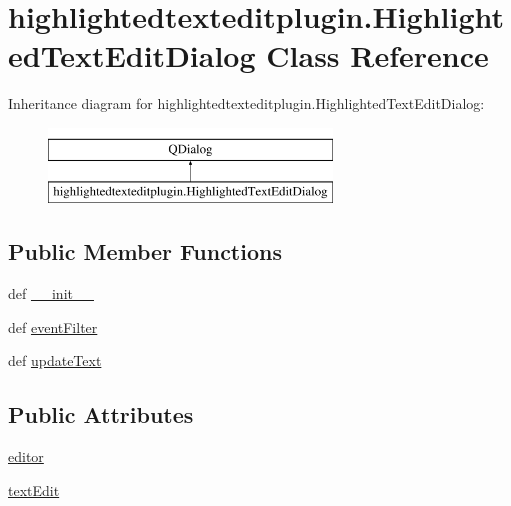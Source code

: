 \hypertarget{classhighlightedtexteditplugin_1_1HighlightedTextEditDialog}{}\section{highlightedtexteditplugin.\+Highlighted\+Text\+Edit\+Dialog Class Reference}
\label{classhighlightedtexteditplugin_1_1HighlightedTextEditDialog}
Inheritance diagram for highlightedtexteditplugin.\+Highlighted\+Text\+Edit\+Dialog\+:\begin{figure}[H]
\begin{center}
\leavevmode
\includegraphics[height=2.000000cm]{classhighlightedtexteditplugin_1_1HighlightedTextEditDialog}
\end{center}
\end{figure}
\subsection*{Public Member Functions}
\begin{DoxyCompactItemize}
\item 
def \hyperlink{classhighlightedtexteditplugin_1_1HighlightedTextEditDialog_acc50ee618617b205b376fad38463822e}{\+\_\+\+\_\+init\+\_\+\+\_\+}
\item 
def \hyperlink{classhighlightedtexteditplugin_1_1HighlightedTextEditDialog_a02284850219be35dfe91a436a5d9c680}{event\+Filter}
\item 
def \hyperlink{classhighlightedtexteditplugin_1_1HighlightedTextEditDialog_a6db8c30868c2394e626dfca05d41f48e}{update\+Text}
\end{DoxyCompactItemize}
\subsection*{Public Attributes}
\begin{DoxyCompactItemize}
\item 
\hyperlink{classhighlightedtexteditplugin_1_1HighlightedTextEditDialog_af013db1f75957dd1815cb92ecd117ef5}{editor}
\item 
\hyperlink{classhighlightedtexteditplugin_1_1HighlightedTextEditDialog_a04a2c07ea4bd833e7c458ab676726087}{text\+Edit}
\end{DoxyCompactItemize}


